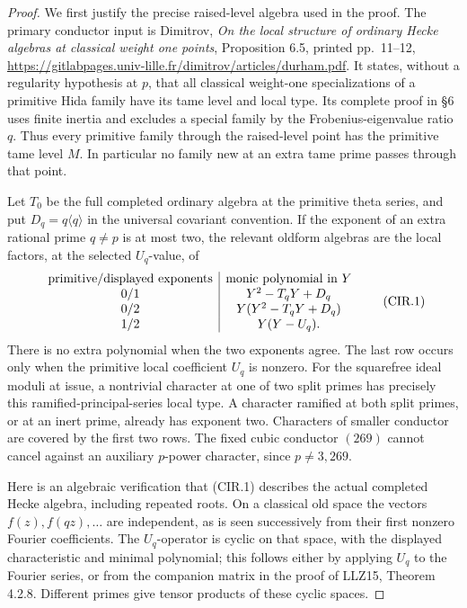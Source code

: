 \begin{proof}
We first justify the precise raised-level algebra used in the proof.
The primary conductor input is Dimitrov,
\emph{On the local structure of ordinary Hecke algebras at classical
weight one points}, Proposition 6.5, printed pp.~11--12,
\url{https://gitlabpages.univ-lille.fr/dimitrov/articles/durham.pdf}.
It states, without a regularity hypothesis at \(p\), that all
classical weight-one specializations of a primitive Hida family
have its tame level and local type.  Its complete proof in \S6
uses finite inertia and excludes a special family by the
Frobenius-eigenvalue ratio \(q\).  Thus every primitive family
through the raised-level point has the primitive tame level \(M\).
In particular no family new at an extra tame prime passes through
that point.

Let \(T_0\) be the full completed ordinary algebra at the primitive
theta series, and put \(D_q=q\langle q\rangle\) in the universal
covariant convention.  If the exponent of an extra rational prime
\(q\neq p\) is at most two, the relevant oldform algebras are
the local factors, at the selected \(U_q\)-value, of
\[
\begin{array}{c|c}
\text{primitive/displayed exponents}&\text{monic polynomial in }Y\cr
0/1&Y^2-T_qY+D_q\cr
0/2&Y(Y^2-T_qY+D_q)\cr
1/2&Y(Y-U_q).
\end{array}                                                    \tag{CIR.1}
\]
There is no extra polynomial when the two exponents agree.
The last row occurs only when the primitive local coefficient
\(U_q\) is nonzero.  For the squarefree ideal moduli at issue,
a nontrivial character at one of two split primes has precisely
this ramified-principal-series local type.  A character ramified
at both split primes, or at an inert prime, already has exponent
two.  Characters of smaller conductor are covered by the first
two rows.  The fixed cubic conductor \((269)\) cannot cancel
against an auxiliary \(p\)-power character, since \(p\neq3,269\).

Here is an algebraic verification that (CIR.1) describes the actual
completed Hecke algebra, including repeated roots.  On a classical
old space the vectors \(f(z),f(qz),\ldots\) are independent, as is
seen successively from their first nonzero Fourier coefficients.
The \(U_q\)-operator is cyclic on that space, with the displayed
characteristic and minimal polynomial; this follows either by
applying \(U_q\) to the Fourier series, or from the companion
matrix in the proof of LLZ15, Theorem 4.2.8.  Different primes
give tensor products of these cyclic spaces.


\end{proof}
